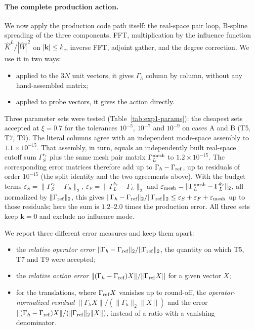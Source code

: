\paragraph{The complete production action.}
We now apply the production code path itself: the real-space pair loop, B-spline spreading of the three components,
FFT, multiplication by the influence function $\hat K^L/|\hat W|^2$ on $|\mathbf k|\le k_c$, inverse FFT, adjoint
gather, and the degree correction. We use it in two ways:
\begin{itemize}
\item applied to the $3N$ unit vectors, it gives $\Gamma_h$ column by column, without any hand-assembled matrix;
\item applied to probe vectors, it gives the action directly.
\end{itemize}
Three parameter sets were tested (Table~\ref{tab:exp1-params}): the cheapest sets accepted at $\xi=0.7$ for the
tolerances $10^{-5}$, $10^{-7}$ and $10^{-9}$ on cases A and B (T5, T7, T9). The literal columns agree with an
independent mode-space assembly to $1.1\times10^{-15}$. That assembly, in turn, equals an independently built
real-space cutoff sum $\Gamma_S^{r_c}$ plus the same mesh pair matrix $\Gamma_L^{\rm mesh}$ to $1.2\times10^{-15}$. The
corresponding error matrices therefore add up to $\Gamma_h-\Gamma_{\rm ref}$, up to residuals of order $10^{-15}$ (the
split identity and the two agreements above). With the budget terms
$\varepsilon_S=\|\Gamma_S^{r_c}-\Gamma_S\|_2$, $\varepsilon_F=\|\Gamma_L^{k_c}-\Gamma_L\|_2$ and
$\varepsilon_{\rm mesh}=\|\Gamma_L^{\rm mesh}-\Gamma_L^{k_c}\|_2$, all normalized by $\|\Gamma_{\rm ref}\|_2$, this gives
$\|\Gamma_h-\Gamma_{\rm ref}\|_2/\|\Gamma_{\rm ref}\|_2\le\varepsilon_S+\varepsilon_F+\varepsilon_{\rm mesh}$ up to those
residuals; here the sum is $1.2$--$2.0$ times the production error. All three sets keep $\mathbf k=0$ and exclude no influence mode.

\begin{table}[t]
\centering\small
\caption{Parameter sets of the production action test (accepted at $\xi=0.7$ for the stated tolerance on cases A and
B). $M$ is the next $2,3,5$-smooth mesh size with $h\le\eta_N\pi/k_c$; the realised $\eta=k_ch/\pi$ is therefore at most
$\eta_N$ and depends on $L$.}
\label{tab:exp1-params}

\end{table}

We report three different error measures and keep them apart:
\begin{itemize}
\item the \emph{relative operator error} $\|\Gamma_h-\Gamma_{\rm ref}\|_2/\|\Gamma_{\rm ref}\|_2$, the quantity on
  which T5, T7 and T9 were accepted;
\item the \emph{relative action error} $\|(\Gamma_h-\Gamma_{\rm ref})X\|/\|\Gamma_{\rm ref}X\|$ for a given vector $X$;
\item for the translations, where $\Gamma_{\rm ref}X$ vanishes up to round-off, the \emph{operator-normalized
  residual} $\|\Gamma_hX\|/(\|\Gamma_h\|_2\|X\|)$ and the error $\|(\Gamma_h-\Gamma_{\rm ref})X\|/(\|\Gamma_{\rm
  ref}\|_2\|X\|)$, instead of a ratio with a vanishing denominator.
\end{itemize}

